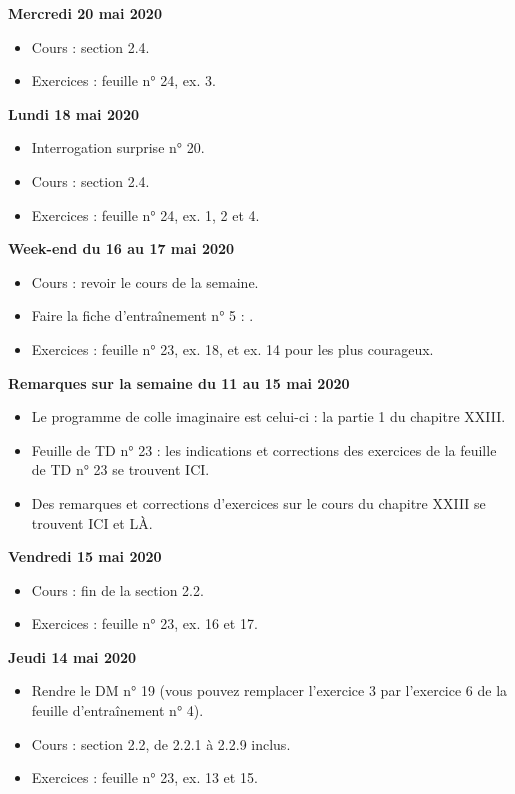 \documentclass[12pt,a4paper]{article}
\begin{document}
\noindent\textbf{Mercredi 20 mai 2020}
\begin{itemize}
\item Cours : section 2.4.
\item Exercices : feuille n° 24, ex. 3.\vspace{.4cm}
\end{itemize}
 
\noindent\textbf{Lundi 18 mai 2020}
\begin{itemize}
\item Interrogation surprise n° 20.
\item Cours : section 2.4.
\item Exercices : feuille n° 24, ex. 1, 2 et 4.\vspace{.4cm}
\end{itemize}

\noindent\textbf{Week-end du 16 au 17 mai 2020}
\begin{itemize}
\item Cours : revoir le cours de la semaine.
\item Faire la fiche d'entraînement n° 5 : .
\item Exercices : feuille n° 23, ex. 18, et ex. 14 pour les plus courageux.\vspace{.4cm}
\end{itemize}

\noindent\textbf{\bf Remarques sur la semaine du 11 au 15 mai 2020}
\begin{itemize}
\item Le programme de colle imaginaire est celui-ci : la partie 1 du chapitre XXIII.
\item Feuille de TD n° 23 : les indications et corrections des exercices de la feuille de TD n° 23 se trouvent ICI.
\item Des remarques et corrections d'exercices sur le cours du chapitre XXIII se trouvent ICI et LÀ.\vspace{.4cm}
\end{itemize}

\noindent\textbf{Vendredi 15 mai 2020}
\begin{itemize}
\item Cours : fin de la section 2.2.
\item Exercices : feuille n° 23, ex. 16 et 17.\vspace{.4cm}
\end{itemize}

\noindent\textbf{Jeudi 14 mai 2020}
\begin{itemize}
\item Rendre le DM n° 19 (vous pouvez remplacer l'exercice 3 par l'exercice 6 de la feuille d'entraînement n° 4).
\item Cours : section 2.2, de 2.2.1 à 2.2.9 inclus.
\item Exercices : feuille n° 23, ex. 13 et 15.\vspace{.4cm}
\end{itemize}
 
\end{document}
